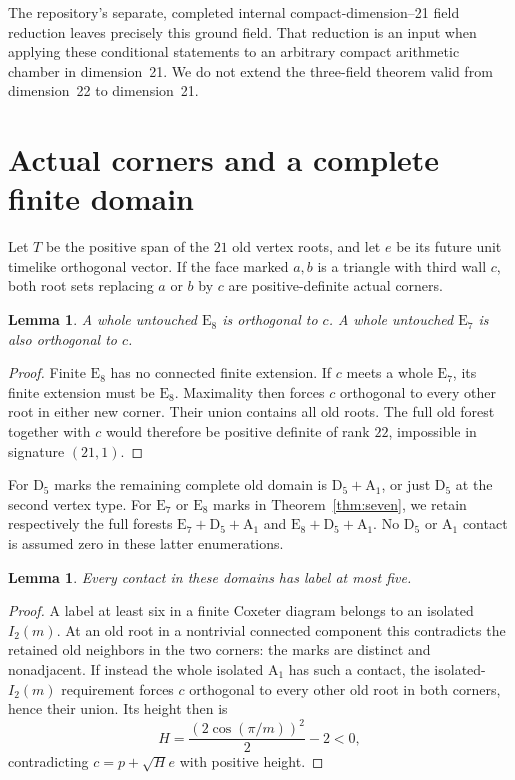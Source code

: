 \documentclass[11pt]{article}
\newtheorem{lemma}[theorem]{Lemma}
\newcommand{\E}{\mathrm E}
\newcommand{\D}{\mathrm D}
\newcommand{\A}{\mathrm A}
\begin{document}
The repository's separate, completed internal compact-dimension--21
field reduction leaves precisely this ground field. That reduction is
an input when applying these conditional statements to an arbitrary
compact arithmetic chamber in dimension~21. We do not extend the
three-field theorem valid from dimension~22 to dimension~21.

\section{Actual corners and a complete finite domain}
Let $T$ be the positive span of the $21$ old vertex roots, and let $e$
be its future unit timelike orthogonal vector. If the face marked $a,b$
is a triangle with third wall $c$, both root sets replacing $a$ or $b$
by $c$ are positive-definite actual corners.

\begin{lemma}\label{lem:isolation}
A whole untouched $\E_8$ is orthogonal to $c$. A whole untouched
$\E_7$ is also orthogonal to $c$.
\end{lemma}
\begin{proof}
Finite $\E_8$ has no connected finite extension. If $c$ meets a whole
$\E_7$, its finite extension must be $\E_8$. Maximality then forces
$c$ orthogonal to every other root in either new corner. Their union
contains all old roots. The full old forest together with $c$ would
therefore be positive definite of rank $22$, impossible in signature
$(21,1)$.
\end{proof}

For $\D_5$ marks the remaining complete old domain is $\D_5+\A_1$,
or just $\D_5$ at the second vertex type. For $\E_7$ or $\E_8$ marks
in Theorem~\ref{thm:seven}, we retain respectively the full forests
$\E_7+\D_5+\A_1$ and $\E_8+\D_5+\A_1$. No $\D_5$ or $\A_1$
contact is assumed zero in these latter enumerations.

\begin{lemma}\label{lem:labels}
Every contact in these domains has label at most five.
\end{lemma}
\begin{proof}
A label at least six in a finite Coxeter diagram belongs to an isolated
$I_2(m)$. At an old root in a nontrivial connected component this
contradicts the retained old neighbors in the two corners: the marks
are distinct and nonadjacent. If instead the whole isolated $\A_1$
has such a contact, the isolated-$I_2(m)$ requirement forces $c$
orthogonal to every other old root in both corners, hence their union.
Its height then is
\[
 H=\frac{(2\cos(\pi/m))^2}{2}-2<0,
\]
contradicting $c=p+\sqrt H e$ with positive height.
\end{proof}
\end{document}
